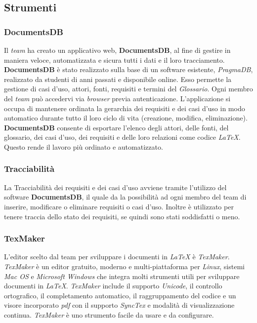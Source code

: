 \subsection{Strumenti}

\subsubsection{DocumentsDB}
Il \textit{team} ha creato un applicativo web, \textbf{DocumentsDB}, al fine di gestire in maniera veloce, automatizzata 
e sicura tutti i dati e il loro tracciamento. \textbf{DocumentsDB} è stato realizzato sulla base di un software esistente, \textit{PragmaDB}, realizzato da
studenti di anni passati e disponibile online. Esso permette la gestione di casi d'uso, attori, fonti, requisiti e termini del \textit{Glossario}. 
Ogni membro del \textit{team} può accedervi via \textit{browser} previa autenticazione.
L'applicazione si occupa di mantenere ordinata la gerarchia dei requisiti e dei casi d'uso in modo automatico durante tutto il loro ciclo di vita (creazione, modifica, eliminazione).
\textbf{DocumentsDB} consente di esportare l'elenco degli attori, delle fonti, del glossario, dei casi d'uso, dei requisiti e delle loro relazioni come codice \textit{\LaTeX{}}.
Questo rende il lavoro più ordinato e automatizzato.

\subsubsection{Tracciabilità}
La Tracciabilità dei requisiti e dei casi d'uso avviene tramite l'utilizzo del software \textbf{DocumentsDB}, il quale da la possibilità ad ogni membro del team di inserire, modificare o eliminare requisiti o casi d'uso. 
Inoltre è utilizzato per tenere traccia dello stato dei requisiti, se quindi sono stati soddisfatti o meno.

\subsubsection{TexMaker}
L'editor scelto dal team per sviluppare i documenti in \textit{\LaTeX{}} è \textit{TexMaker}.  
\textit{TexMaker} è un editor gratuito, moderno e multi-piattaforma per \textit{Linux}, sistemi \textit{Mac OS} e \textit{Microsoft Windows} che integra molti strumenti utili per sviluppare documenti in \textit{\LaTeX{}}.
\textit{TexMaker} include il supporto \textit{Unicode}, il controllo ortografico, il completamento automatico, il raggruppamento del codice e un visore incorporato \textit{pdf} con il supporto \textit{SyncTex} e modalità di visualizzazione continua.
\textit{TexMaker} è uno strumento facile da usare e da configurare.


